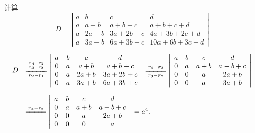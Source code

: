 \documentclass[10pt,a4paper%
tablecaptionabove]{article}
\newcommand{\ds}{\displaystyle}
\begin{document}
\begin{CJK}{UTF8}{gkai}
  \begin{li}
    计算
    $$
    D = \left |
      \begin{array}{cccc}
        a &    b &       c &           d  \\
        a &  a+b &   a+b+c &     a+b+c+d  \\
        a & 2a+b & 3a+2b+c &  4a+3b+2c+d  \\
        a & 3a+b & 6a+3b+c & 10a+6b+3c+d   
      \end{array}
    \right|
    $$
  \end{li}
  \begin{jie}
    $$
    \begin{array}{ll}
      D &  \ds \xlongequal[r_2-r_1]{r_4-r_3\atop r_3-r_2}
          \left |
          \begin{array}{cccc}
            a &    b &     c &         d  \\
            0 &    a &   a+b &     a+b+c  \\
            0 &    a &  2a+b &   3a+2b+c  \\
            0 &    a &  3a+b &   6a+3b+c   
          \end{array}\right| \xlongequal[r_3-r_2]{r_4-r_3}\left |
                               \begin{array}{cccc}
                                 a &    b &     c &         d  \\
                                 0 &    a &   a+b &     a+b+c  \\
                                 0 &    0 &     a &      2a+b  \\
                                 0 &    0 &     a &      3a+b   
                               \end{array}
                                                    \right|
      \\[1.0cm]
        &  \ds \xlongequal{r_4-r_3} \left |
          \begin{array}{cccc}
            a &    b &     c &         d  \\
            0 &    a &   a+b &     a+b+c  \\
            0 &    0 &     a &      2a+b  \\
            0 &    0 &     0 &         a   
          \end{array}
                               \right| = a^4.      
    \end{array}
    $$
  \end{jie}


\end{CJK}
\end{document}
